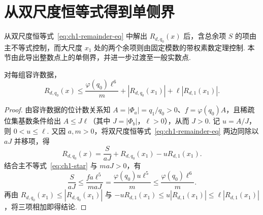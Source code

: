 \section{从双尺度恒等式得到单侧界}
\label{sec:one-sided-bound}

从双尺度恒等式~\eqref{eq:ch1-remainder-eq} 中解出 $R_{d,q_0}(x)$ 后，含总余项 $S$ 的项由主不等式控制，而大尺度 $x_1$ 处的两个余项则由固定模数的带权素数定理控制. 本节由此导出整数点上的单侧界，并进一步过渡至一般实数点.

\begin{lemma}[归一化的双尺度上界]
\label{lem:normalized}
\emitthmsource
对每组容许数据，
\[
 R_{d,q_0}(x)\le\frac{\varphi(q_0)\ell^6}{m}
                     +|R_{d,q_0}(x_1)|+\ell|R_{d,1}(x_1)|.
\]
\end{lemma}
\begin{proof}
由容许数据的位计数关系知 $A=|\Phi_a|=q_1/q_0>0$、$f=\varphi(q_0)A$，且稀疏位集基数条件给出 $A\le J\ell$（其中 $J=|\Phi_b|$，$\ell>0$），从而 $J>0$. 记 $u=A/J$，则 $0<u\le\ell$. 又因 $a,m>0$，将双尺度恒等式~\eqref{eq:ch1-remainder-eq} 两边同除以 $aJ$ 并移项，得
\[
 R_{d,q_0}(x)
 =\frac{S}{aJ}+R_{d,q_0}(x_1)-uR_{d,1}(x_1).
\]
结合主不等式~\eqref{eq:ch1-star} 与 $maJ>0$，有
\[
 \frac{S}{aJ}\le\frac{fa\ell^5}{maJ}
   =\frac{\varphi(q_0)u\ell^5}{m}
   \le\frac{\varphi(q_0)\ell^6}{m}.
\]
再由 $R_{d,q_0}(x_1)\le |R_{d,q_0}(x_1)|$ 与
$-uR_{d,1}(x_1)\le u|R_{d,1}(x_1)|\le\ell|R_{d,1}(x_1)|$，将三项相加即得结论.
\end{proof}

